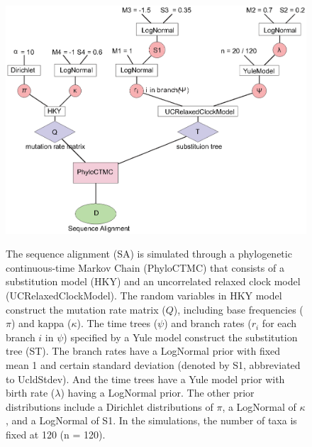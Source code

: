 \documentclass{bmcart}
\begin{document}
\begin{backmatter}
\begin{figure}[h!]
\includegraphics[width=12cm]{Fig11-modelvalidation.eps}\\
\caption{
             The sequence alignment (SA) is simulated through a phylogenetic continuous-time Markov Chain (PhyloCTMC) that consists of a substitution model (HKY) and an uncorrelated relaxed clock model (UCRelaxedClockModel). The random variables in HKY model construct the mutation rate matrix ($Q$), including base frequencies ($\pi$) and kappa ($\kappa$). The time trees ($\psi$) and branch rates ($r_i$ for each branch $i$ in $\psi$)  specified by a Yule model construct the substitution tree (ST). The branch rates have a LogNormal prior with fixed mean 1 and certain standard deviation (denoted by S1, abbreviated to UcldStdev). And the time trees have a Yule model prior with birth rate ($\lambda$) having a LogNormal prior. The other prior distributions include a Dirichlet distributions of $\pi$, a LogNormal of $\kappa$, and a LogNormal of S1. In the simulations, the number of taxa is fixed at 120 (n = 120).}
\label{modelvalidation}
\end{figure}


\end{backmatter}
\end{document}
